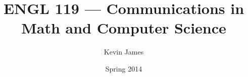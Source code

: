 \documentclass[12pt]{article}
\begin{document}
\title{ENGL 119 --- Communications in Math and Computer Science}
\author{Kevin James}
\date{\vspace{-2ex}Spring 2014}
\maketitle\HRule
\end{document}
